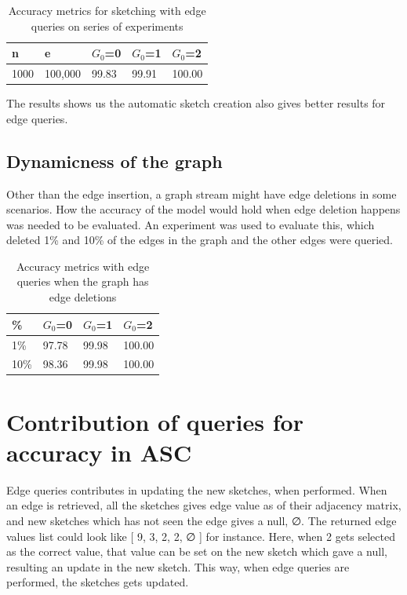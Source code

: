 \documentclass[12pt]{report}
\numberwithin{figure}{section}
\numberwithin{table}{section}
\begin{document}
\begin{table}[H]
\centering
\begin{tabular}{|l|l|l|l|l|}
\hline
n    & e     & $G_0$=0 & $G_0$=1 & $G_0$=2 \\ \hline
1000 & 100,000 & 99.83   & 99.91   & 100.00   \\ \hline
\end{tabular}
\caption{Accuracy metrics for sketching with edge queries on series of experiments}
\end{table}

The results shows us the automatic sketch creation also gives better results for edge queries.

\subsection{Dynamicness of the graph}

Other than the edge insertion, a graph stream might have edge deletions in some scenarios. How the accuracy of the model would hold when edge deletion happens was needed to be evaluated. An experiment was used to evaluate this, which deleted 1\% and 10\% of the edges in the graph and the other edges were queried. 


\begin{table}[H]
\centering
\begin{tabular}{|l|l|l|l|}
\hline
\%     & $G_0$=0 & $G_0$=1 & $G_0$=2 \\ \hline
1\% & 97.78   & 99.98   & 100.00   \\ \hline
10\% & 98.36   & 99.98   & 100.00   \\ \hline
\end{tabular}
\caption{Accuracy metrics with edge queries when the graph has edge deletions}
\end{table}

\section{Contribution of queries for accuracy in ASC}

Edge queries contributes in updating the new sketches, when performed. When an edge is retrieved, all the  sketches gives edge value as of their adjacency matrix, and new sketches which has not seen the edge gives a null, ∅. The returned edge values list could look like [ 9, 3, 2, 2, ∅ ] for instance. Here, when 2 gets selected as the correct value, that value can be set on the new sketch which gave a null, resulting an update in the new sketch. This way, when edge queries are performed, the sketches gets updated. 
\end{document}
